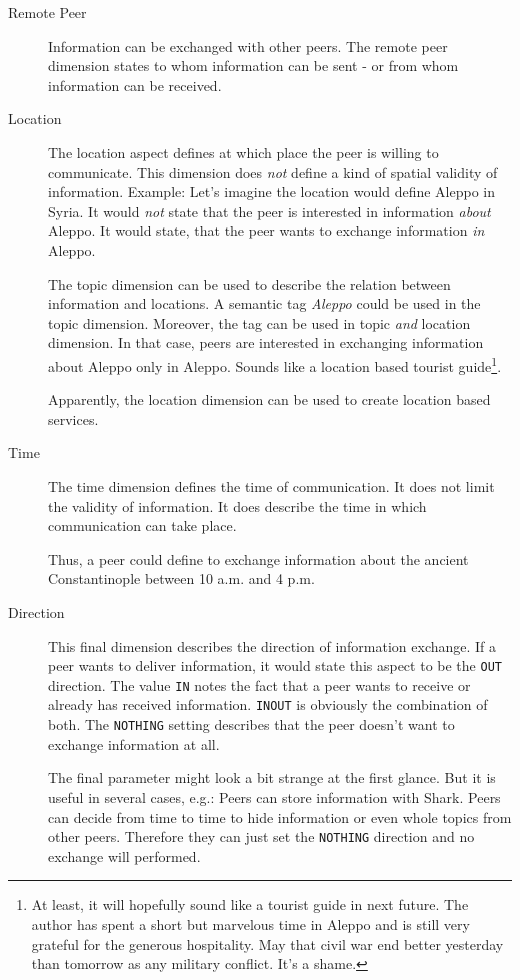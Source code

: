 \begin{description}
    \item[Remote Peer] Information can be exchanged with other peers. The remote peer dimension states to whom information can be sent - or from whom information can be received.

    \item[Location] 
The location aspect defines at which place the peer is willing to communicate. This dimension does {\it not} define a kind of spatial validity of information. Example: Let's imagine the location would define Aleppo in Syria. It would {\it not} state that the peer is interested in information {\it about} Aleppo. It would state, that the peer wants to exchange information {\it in} Aleppo.

The topic dimension can be used to describe the relation between information and locations. A semantic tag {\it Aleppo} could be used in the topic dimension. Moreover, the tag can be used in topic {\it and} location dimension. In that case, peers are interested in exchanging information about Aleppo only in Aleppo. Sounds like a location based tourist guide\footnote{At least, it will hopefully sound like a tourist guide in next future. The author has spent a short but marvelous time in Aleppo and is still very grateful for the generous hospitality. May that civil war end better yesterday than tomorrow as any military conflict. It's a shame.}.

Apparently, the location dimension can be used to create location based services.

    \item[Time] 
The time dimension defines the time of communication. It does not limit the validity of information. It does describe the time in which communication can take place.

Thus, a peer could define to exchange information about the ancient Constantinople between 10 a.m. and 4 p.m.

    \item[Direction] 
This final dimension describes the direction of information exchange. If a peer wants to deliver information, it would state this aspect to be the {\tt OUT} direction. The value {\tt IN} notes the fact that a peer wants to receive or already has received information. {\tt INOUT} is obviously the combination of both. The {\tt NOTHING} setting describes that the peer doesn't want to exchange information at all.

The final parameter might look a bit strange at the first glance. But it is useful in several cases, e.g.: Peers can store information with Shark. Peers can decide from time to time to hide information or even whole topics from other peers. Therefore they can just set the {\tt NOTHING} direction and no exchange will performed.

\end{description}

